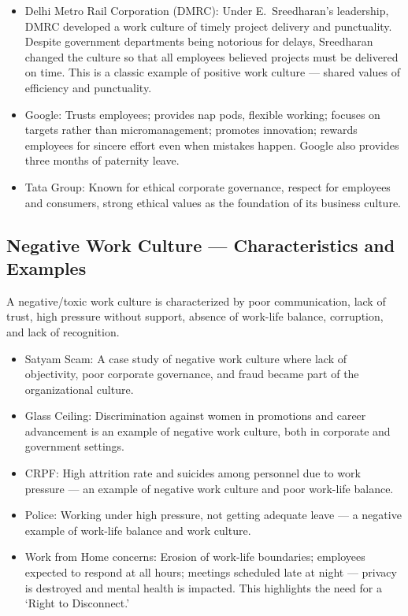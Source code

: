 \begin{ExampleBox}
\begin{itemize}
\item Delhi Metro Rail Corporation (DMRC): Under E.\ Sreedharan's leadership, DMRC developed a work culture of timely project delivery and punctuality. Despite government departments being notorious for delays, Sreedharan changed the culture so that all employees believed projects must be delivered on time. This is a classic example of positive work culture --- shared values of efficiency and punctuality.
\item Google: Trusts employees; provides nap pods, flexible working; focuses on targets rather than micromanagement; promotes innovation; rewards employees for sincere effort even when mistakes happen. Google also provides three months of paternity leave.
\item Tata Group: Known for ethical corporate governance, respect for employees and consumers, strong ethical values as the foundation of its business culture.
\end{itemize}
\end{ExampleBox}

\subsection{Negative Work Culture --- Characteristics and Examples}
A negative/toxic work culture is characterized by poor communication, lack of trust, high pressure without support, absence of work-life balance, corruption, and lack of recognition.

\begin{ExampleBox}
\begin{itemize}
\item Satyam Scam: A case study of negative work culture where lack of objectivity, poor corporate governance, and fraud became part of the organizational culture.
\item Glass Ceiling: Discrimination against women in promotions and career advancement is an example of negative work culture, both in corporate and government settings.
\item CRPF: High attrition rate and suicides among personnel due to work pressure --- an example of negative work culture and poor work-life balance.
\item Police: Working under high pressure, not getting adequate leave --- a negative example of work-life balance and work culture.
\item Work from Home concerns: Erosion of work-life boundaries; employees expected to respond at all hours; meetings scheduled late at night --- privacy is destroyed and mental health is impacted. This highlights the need for a `Right to Disconnect.'
\end{itemize}
\end{ExampleBox}


